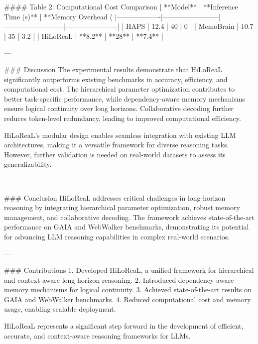 #### Table 2: Computational Cost Comparison
| **Model**        | **Inference Time (s)** | **Memory Overhead (%
|-------------------|------------------------|--------------------------|-----------------------|
| HAPS             | 12.4                   | 40                       | 0                     |
| MemoBrain        | 10.7                   | 35                       | 3.2                   |
| HiLoReaL         | **8.2**                | **28**                   | **7.4**               |

---

### Discussion
The experimental results demonstrate that HiLoReaL significantly outperforms existing benchmarks in accuracy, efficiency, and computational cost. The hierarchical parameter optimization contributes to better task-specific performance, while dependency-aware memory mechanisms ensure logical continuity over long horizons. Collaborative decoding further reduces token-level redundancy, leading to improved computational efficiency.

HiLoReaL’s modular design enables seamless integration with existing LLM architectures, making it a versatile framework for diverse reasoning tasks. However, further validation is needed on real-world datasets to assess its generalizability.

---

### Conclusion
HiLoReaL addresses critical challenges in long-horizon reasoning by integrating hierarchical parameter optimization, robust memory management, and collaborative decoding. The framework achieves state-of-the-art performance on GAIA and WebWalker benchmarks, demonstrating its potential for advancing LLM reasoning capabilities in complex real-world scenarios.

---

### Contributions
1. Developed HiLoReaL, a unified framework for hierarchical and context-aware long-horizon reasoning.
2. Introduced dependency-aware memory mechanisms for logical continuity.
3. Achieved state-of-the-art results on GAIA and WebWalker benchmarks.
4. Reduced computational cost and memory usage, enabling scalable deployment.

HiLoReaL represents a significant step forward in the development of efficient, accurate, and context-aware reasoning frameworks for LLMs.